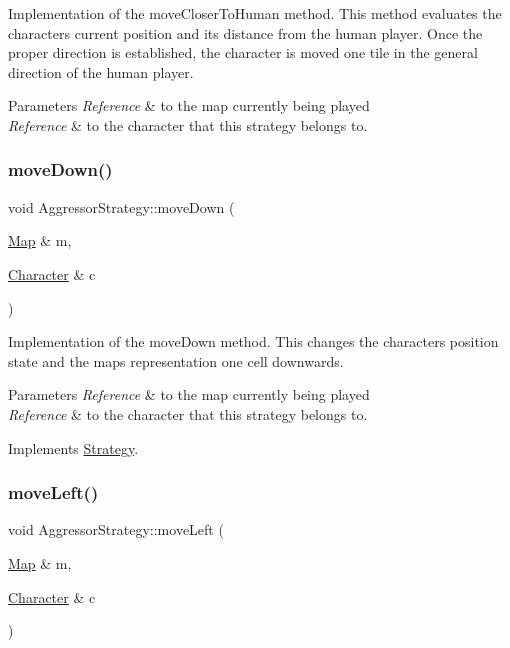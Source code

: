 Implementation of the move\+Closer\+To\+Human method. This method evaluates the character\textquotesingle{}s current position and its distance from the human player. Once the proper direction is established, the character is moved one tile in the general direction of the human player. 
\begin{DoxyParams}{Parameters}
{\em Reference} & to the map currently being played \\
\hline
{\em Reference} & to the character that this strategy belongs to. \\
\hline
\end{DoxyParams}
\hypertarget{classAggressorStrategy_a9a7ca424c311204957f647d92c39cbb9}{}\label{classAggressorStrategy_a9a7ca424c311204957f647d92c39cbb9} 
\subsubsection{\texorpdfstring{move\+Down()}{moveDown()}}
{\footnotesize\ttfamily void Aggressor\+Strategy\+::move\+Down (\begin{DoxyParamCaption}\item[{\hyperlink{classMap}{Map} \&}]{m,  }\item[{\hyperlink{classCharacter}{Character} \&}]{c }\end{DoxyParamCaption})\hspace{0.3cm}{\ttfamily [virtual]}}

Implementation of the move\+Down method. This changes the character\textquotesingle{}s position state and the map\textquotesingle{}s representation one cell downwards. 
\begin{DoxyParams}{Parameters}
{\em Reference} & to the map currently being played \\
\hline
{\em Reference} & to the character that this strategy belongs to. \\
\hline
\end{DoxyParams}


Implements \hyperlink{classStrategy}{Strategy}.

\hypertarget{classAggressorStrategy_a19633eb812b64a4231ab8d4132ee0df7}{}\label{classAggressorStrategy_a19633eb812b64a4231ab8d4132ee0df7} 
\subsubsection{\texorpdfstring{move\+Left()}{moveLeft()}}
{\footnotesize\ttfamily void Aggressor\+Strategy\+::move\+Left (\begin{DoxyParamCaption}\item[{\hyperlink{classMap}{Map} \&}]{m,  }\item[{\hyperlink{classCharacter}{Character} \&}]{c }\end{DoxyParamCaption})\hspace{0.3cm}{\ttfamily [virtual]}}

